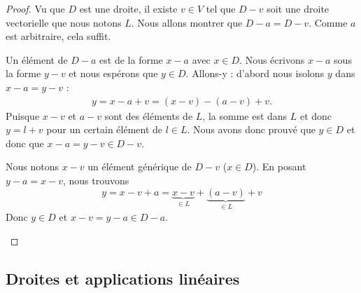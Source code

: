 \begin{proof}
	Vu que \( D\) est une droite, il existe \( v\in V\) tel que \( D-v\) soit une droite vectorielle que nous notons \( L\). Nous allons montrer que \( D-a=D-v\). Comme \( a\) est arbitraire, cela suffit.

	\begin{subproof}
		\spitem[\( D-a\subset D-v\)]
		Un élément de \( D-a\) est de la forme \( x-a\) avec \( x\in D\). Nous écrivons \( x-a\) sous la forme \( y-v\) et nous espérons que \( y\in D\). Allons-y : d'abord nous isolons \( y\) dans \( x-a=y-v\) :
		\begin{subequations}
			\begin{align}
				y=x-a+v=(x-v)-(a-v)+v.
			\end{align}
		\end{subequations}
		Puisque \( x-v\) et \( a-v\) sont des éléments de \( L\), la somme est dans \( L\) et donc \( y=l+v\) pour un certain élément de \( l\in L\). Nous avons donc prouvé que \( y\in D\) et donc que \( x-a=y-v\in D-v\).

		\spitem[\( D-v\subset D-a\)]
		Nous notons \( x-v\) un élément générique de \( D-v\) (\( x\in D\)). En posant \( y-a=x-v\), nous trouvons
		\begin{equation}
			y=x-v+a=\underbrace{x-v}_{\in L}+\underbrace{(a-v)}_{\in L}+v
		\end{equation}
		Donc \( y\in D\) et \( x-v=y-a\in D-a\).
	\end{subproof}
\end{proof}


\subsection{Droites et applications linéaires}


